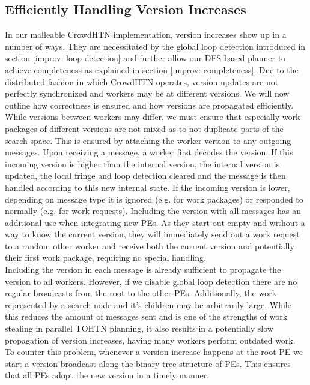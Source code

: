 \subsection{Efficiently Handling Version Increases}
In our malleable CrowdHTN implementation, version increases show up in a number of ways. They are necessitated by the global loop detection introduced in section \ref{improv: loop detection} and further allow our DFS based planner to achieve completeness as explained in section \ref{improv: completeness}. Due to the distributed fashion in which CrowdHTN operates, version updates are not perfectly synchronized and workers may be at different versions. We will now outline how correctness is ensured and how versions are propagated efficiently. \\
While versions between workers may differ, we must ensure that especially work packages of different versions are not mixed as to not duplicate parts of the search space. This is ensured by attaching the worker version to any outgoing messages. Upon receiving a message, a worker first decodes the version. If this incoming version is higher than the internal version, the internal version is updated, the local fringe and loop detection cleared and the message is then handled according to this new internal state. If the incoming version is lower, depending on message type it is ignored (e.g. for work packages) or responded to normally (e.g. for work requests). Including the version with all messages has an additional use when integrating new PEs. As they start out empty and without a way to know the current version, they will immediately send out a work request to a random other worker and receive both the current version and potentially their first work package, requiring no special handling. \\
Including the version in each message is already sufficient to propagate the version to all workers. However, if we disable global loop detection there are no regular broadcasts from the root to the other PEs. Additionally, the work represented by a search node and it's children may be arbitrarily large. While this reduces the amount of messages sent and is one of the strengths of work stealing in parallel TOHTN planning, it also results in a potentially slow propagation of version increases, having many workers perform outdated work. To counter this problem, whenever a version increase happens at the root PE we start a version broadcast along the binary tree structure of PEs. This ensures that all PEs adopt the new version in a timely manner.

